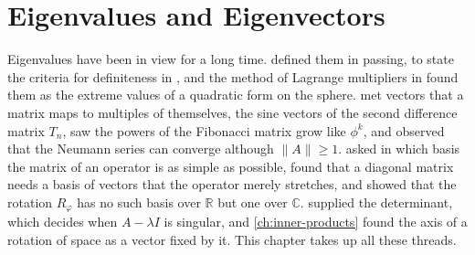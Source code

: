 \chapter{Eigenvalues and Eigenvectors}
\label{ch:eigenvalues}


Eigenvalues have been in view for a long time.  defined them in passing, to state the criteria for definiteness in , and the method of Lagrange multipliers in  found them as the extreme values of a quadratic form on the sphere.  met vectors that a matrix maps to multiples of themselves, the sine vectors of the second difference matrix $T_n$, saw the powers of the Fibonacci matrix grow like $\phi^k$, and observed that the Neumann series can converge although $\|A\|\ge1$.  asked in which basis the matrix of an operator is as simple as possible, found that a diagonal matrix needs a basis of vectors that the operator merely stretches, and showed that the rotation $R_\varphi$ has no such basis over $\mathbb R$ but one over $\mathbb C$.  supplied the determinant, which decides when $A-\lambda I$ is singular, and \cref{ch:inner-products} found the axis of a rotation of space as a vector fixed by it. This chapter takes up all these threads.

